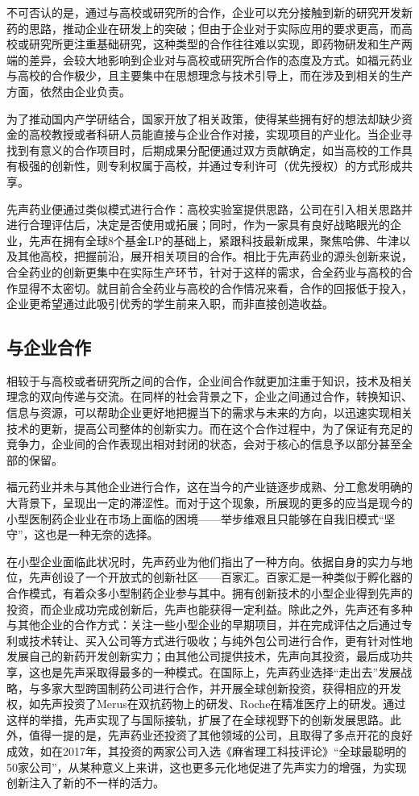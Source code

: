 \documentclass[twocolumn]{ctexbook}
\begin{document}
			不可否认的是，通过与高校或研究所的合作，企业可以充分接触到新的研究开发新药的思路，推动企业在研发上的突破；但由于企业对于实际应用的要求更高，而高校或研究所更注重基础研究，这种类型的合作往往难以实现，即药物研发和生产两端的差异，会较大地影响到企业对与高校或研究所合作的态度及方式。如福元药业与高校的合作极少，且主要集中在思想理念与技术引导上，而在涉及到相关的生产方面，依然由企业负责。
			
			为了推动国内产学研结合，国家开放了相关政策，使得某些拥有好的想法却缺少资金的高校教授或者科研人员能直接与企业合作对接，实现项目的产业化。当企业寻找到有意义的合作项目时，后期成果分配便通过双方贡献确定，如当高校的工作具有极强的创新性，则专利权属于高校，并通过专利许可（优先授权）的方式形成共享。
			
			先声药业便通过类似模式进行合作：高校实验室提供思路，公司在引入相关思路并进行合理评估后，决定是否使用或拓展；同时，作为一家具有良好战略眼光的企业，先声在拥有全球8个基金LP的基础上，紧跟科技最新成果，聚焦哈佛、牛津以及其他高校，把握前沿，展开相关项目的合作。相比于先声药业的源头创新来说，合全药业的创新更集中在实际生产环节，针对于这样的需求，合全药业与高校的合作显得不太密切。就目前合全药业与高校的合作情况来看，合作的回报低于投入，企业更希望通过此吸引优秀的学生前来入职，而非直接创造收益。
			
			
			\subsection{与企业合作}
			
			相较于与高校或者研究所之间的合作，企业间合作就更加注重于知识，技术及相关理念的双向传递与交流。在同样的社会背景之下，企业之间通过合作，转换知识、信息与资源，可以帮助企业更好地把握当下的需求与未来的方向，以迅速实现相关技术的更新，提高公司整体的创新实力。而在这个合作过程中，为了保证有充足的竞争力，企业间的合作表现出相对封闭的状态，会对于核心的信息予以部分甚至全部的保留。
			
			福元药业并未与其他企业进行合作，这在当今的产业链逐步成熟、分工愈发明确的大背景下，呈现出一定的滞涩性。而对于这个现象，所展现的更多的应当是现今的小型医制药企业业在市场上面临的困境——举步维艰且只能够在自我旧模式“坚守”，这也是一种无奈的选择。
			
			在小型企业面临此状况时，先声药业为他们指出了一种方向。依据自身的实力与地位，先声创设了一个开放式的创新社区——百家汇。百家汇是一种类似于孵化器的合作模式，有着众多小型制药企业参与其中。拥有创新技术的小型企业得到先声的投资，而企业成功完成创新后，先声也能获得一定利益。除此之外，先声还有多种与其他企业的合作方式：关注一些小型企业的早期项目，并在完成评估之后通过专利或技术转让、买入公司等方式进行吸收；与纯外包公司进行合作，更有针对性地发展自己的新药开发创新实力；由其他公司提供技术，先声向其投资，最后成功共享，这也是先声采取得最多的一种模式。在国际上，先声药业选择“走出去”发展战略，与多家大型跨国制药公司进行合作，并开展全球创新投资，获得相应的开发权，如先声投资了Merus在双抗药物上的研发、Roche在精准医疗上的研发。通过这样的举措，先声实现了与国际接轨，扩展了在全球视野下的创新发展思路。此外，值得一提的是，先声药业还投资了其他领域的公司，且取得了多点开花的良好成效，如在2017年，其投资的两家公司入选《麻省理工科技评论》“全球最聪明的50家公司”，从某种意义上来讲，这也更多元化地促进了先声实力的增强，为实现创新注入了新的不一样的活力\citep{RN5}。
			
\end{document}
